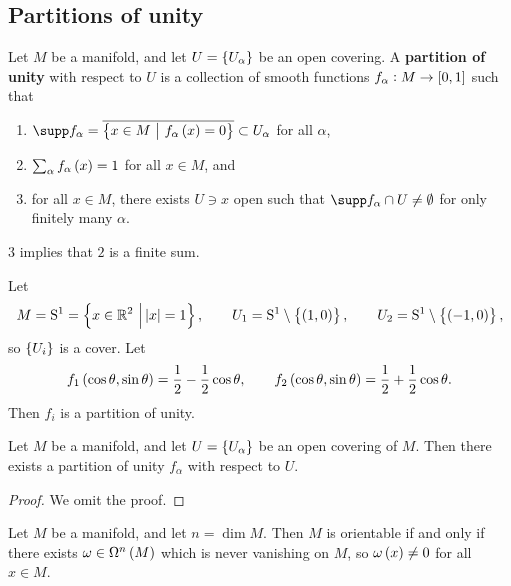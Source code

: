 \pagebreak

\subsection{Partitions of unity}

\begin{definition}
Let $ M $ be a manifold, and let $ U = \cbr{U_\alpha} $ be an open covering. A \textbf{partition of unity} with respect to $ U $ is a collection of smooth functions $ f_\alpha : M \to \sbr{0, 1} $ such that
\begin{enumerate}
\item $ \supp f_\alpha = \overline{\cbr{x \in M \st f_\alpha\br{x} = 0}} \subset U_\alpha $ for all $ \alpha $,
\item $ \sum_\alpha f_\alpha\br{x} = 1 $ for all $ x \in M $, and
\item for all $ x \in M $, there exists $ U \ni x $ open such that $ \supp f_\alpha \cap U \ne \emptyset $ for only finitely many $ \alpha $.
\end{enumerate}
\end{definition}

\begin{remark*}
$ 3 $ implies that $ 2 $ is a finite sum.
\end{remark*}

\begin{example}
Let
$$ M = \S^1 = \cbr{x \in \RR^2 \st \abs{x} = 1}, \qquad U_1 = \S^1 \setminus \cbr{\br{1, 0}}, \qquad U_2 = \S^1 \setminus \cbr{\br{-1, 0}}, $$
so $ \cbr{U_i} $ is a cover. Let
$$ f_1\br{\cos \theta, \sin \theta} = \dfrac{1}{2} - \dfrac{1}{2}\cos \theta, \qquad f_2\br{\cos \theta, \sin \theta} = \dfrac{1}{2} + \dfrac{1}{2}\cos \theta. $$
Then $ f_i $ is a partition of unity.
\end{example}

\begin{theorem}
Let $ M $ be a manifold, and let $ U = \cbr{U_\alpha} $ be an open covering of $ M $. Then there exists a partition of unity $ f_\alpha $ with respect to $ U $.
\end{theorem}

\begin{proof}
We omit the proof.
\end{proof}

\begin{proposition}
\label{prop:1.23}
Let $ M $ be a manifold, and let $ n = \dim M $. Then $ M $ is orientable if and only if there exists $ \omega \in \Omega^n\br{M} $ which is never vanishing on $ M $, so $ \omega\br{x} \ne 0 $ for all $ x \in M $.
\end{proposition}

